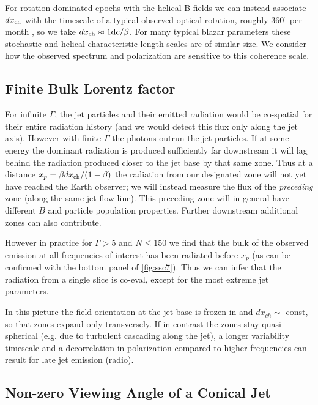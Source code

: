For rotation-dominated epochs with the helical B fields we can instead associate $dx_{\rm ch}$ with the timescale of a typical observed optical rotation, roughly $360^{\circ}$ per month \citep{blinov_robopol:_2018}, so we take $dx_{\rm ch} \approx 1{\rm d} c/\beta$. For many typical blazar parameters these stochastic and helical characteristic length scales are of similar size. We consider how the observed spectrum and polarization are sensitive to this coherence scale.

\subsection{Finite Bulk Lorentz factor}

For infinite $\Gamma$, the jet particles and their emitted radiation would be co-spatial for their entire radiation history (and we would detect this flux only along the jet axis). However with finite $\Gamma$ the photons outrun the jet particles. If at some energy the dominant radiation is produced sufficiently far downstream it will lag behind the radiation produced closer to the jet base by that same zone. Thus at a distance $x_p = \beta dx_{\rm ch} / (1 - \beta)$ the radiation from our designated zone will not yet have reached the Earth observer; we will instead measure the flux of the {\it preceding} zone (along the same jet flow line). This preceding zone will in general have different $B$ and particle population properties. Further downstream additional zones can also contribute.

However in practice for $\Gamma > 5$ and $N \leq 150$ we find that the bulk of the observed emission at all frequencies of interest has been radiated before $x_p$ (as can be confirmed with the bottom panel of \cref{fig:ssc7}). Thus we can infer that the radiation from a single slice is co-eval, except for the most extreme jet parameters. 

In this picture the field orientation at the jet base is frozen in and $dx_{ch}\sim$ const, so that zones expand only transversely. If in contrast the zones stay quasi-spherical (e.g. due to turbulent cascading along the jet), a longer variability timescale and a decorrelation in polarization compared to higher frequencies can result for late jet emission (radio). 

\subsection{Non-zero Viewing Angle of a Conical Jet}


